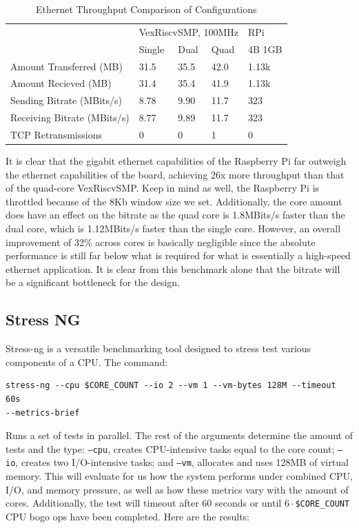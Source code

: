 \begin{table}[ht]
    \centering
    \caption{Ethernet Throughput Comparison of Configurations}
    \begin{tabular}{lllll}
                                & \multicolumn{3}{l}{VexRiscvSMP, 100MHz} & RPi    \\ \cline{2-5} 
                                & Single        & Dual       & Quad       & 4B 1GB \\ \hline
    Amount Transferred (MB)     & 31.5          & 35.5       & 42.0       & 1.13k  \\
    Amount Recieved (MB)        & 31.4          & 35.4       & 41.9       & 1.13k  \\
    Sending Bitrate (MBits/s)   & 8.78          & 9.90       & 11.7       & 323    \\
    Receiving Bitrate (MBits/s) & 8.77          & 9.89       & 11.7       & 323    \\
    TCP Retransmissions         & 0             & 0          & 1          & 0      \\ \hline
    \end{tabular}
    \label{table:ethernet1}
\end{table}

It is clear that the gigabit ethernet capabilities of the Raspberry Pi far outweigh the ethernet capabilities of the board, achieving 26x more throughput than that of the quad-core VexRiscvSMP. Keep in mind as well, the Raspberry Pi is throttled because of the 8Kb window size we set. Additionally, the core amount does have an effect on the bitrate as the quad core is 1.8MBits/s faster than the dual core, which is 1.12MBits/s faster than the single core. However, an overall improvement of 32\% across cores is basically negligible since the absolute performance is still far below what is required for what is essentially a high-speed ethernet application. It is clear from this benchmark alone that the bitrate will be a significant bottleneck for the design.

\subsection{Stress NG}
Stress-ng is a versatile benchmarking tool designed to stress test various components of a CPU. The command:
\begin{verbatim}
stress-ng --cpu $CORE_COUNT --io 2 --vm 1 --vm-bytes 128M --timeout 60s 
--metrics-brief
\end{verbatim}
Runs a set of tests in parallel. The rest of the arguments determine the amount of tests and the type: \texttt{--cpu}, creates CPU-intensive tasks equal to the core count; \texttt{--io}, creates two I/O-intensive tasks; and \texttt{--vm}, allocates and uses 128MB of virtual memory. This will evaluate for us how the system performs under combined CPU, I/O, and memory pressure, as well as how these metrics vary with the amount of cores. Additionally, the test will timeout after 60 seconds or until $6\cdot$\texttt{\$CORE\_COUNT} CPU bogo ops have been completed. Here are the results:

